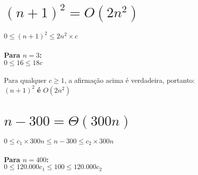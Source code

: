 \documentclass[answers]{exam}
\begin{document}
\begin{questions}
\begin{parts}
        \part{${(n+1)}^2=O(2n^{2})$}
        \begin{solution}
            $0 \le {(n+1)}^2 \le 2{n}^2 \times c$\\
            \\
            \textbf{Para $n=3$:}\\
            $0 \le 16 \le 18c$\\
            \\
            Para qualquer $c \ge 1$, a afirmação acima é verdadeira, portanto:\\
            ${(n+1)}^2$ \textbf{é} $O(2n^{2})$
        \end{solution}

        \part{$n-300=\Theta(300n)$}
        \begin{solution}
            $0 \le c_1 \times 300n \le n - 300 \le c_2 \times 300n$\\
            \\
            \textbf{Para $n=400$:}\\
            $0 \le 120.000{c_1} \le 100 \le 120.000{c_2} $
        \end{solution}
    \end{parts}


\end{questions}
\end{document}

